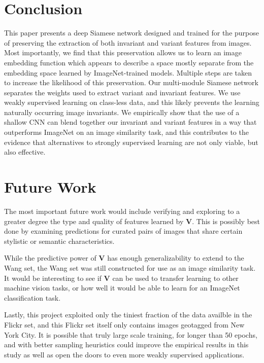 

\section{Conclusion}
This paper presents a deep Siamese network designed and trained for the purpose of preserving the extraction of both invariant and variant features from images. Most importantly, we find that this preservation allows us to learn an image embedding function which appears to describe a space mostly separate from the embedding space learned by ImageNet-trained models. Multiple steps are taken to increase the likelihood of this preservation. Our multi-module Siamese network separates the weights used to extract variant and invariant features. We use weakly supervised learning on class-less data, and this likely prevents the learning naturally occurring image invariants. We empirically show that the use of a shallow CNN can blend together our invariant and variant features in a way that outperforms ImageNet on an image similarity task, and this contributes to the evidence that alternatives to strongly supervised learning are not only viable, but also effective.


\section{Future Work}
The most important future work would include verifying and exploring to a greater degree the type and quality of features learned by $\mathbf{V}$. This is possibly best done by examining predictions for curated pairs of images that share certain stylistic or semantic characteristics. 

While the predictive power of $\mathbf{V}$ has enough generalizability to extend to the Wang set, the Wang set was still constructed for use as an image similarity task. It would be interesting to see if $\mathbf{V}$ can be used to transfer learning to other machine vision tasks, or how well it would be able to learn for an ImageNet classification task. 

Lastly, this project exploited only the tiniest fraction of the data availble in the Flickr set, and this Flickr set itself only contains images geotagged from New York City. It is possible that truly large scale training, for longer than 50 epochs, and with better sampling heuristics could improve the empirical results in this study as well as open the doors to even more weakly supervised applications.